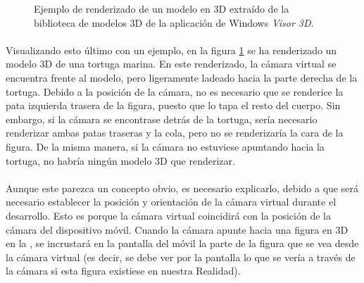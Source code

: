 \documentclass{subfiles}
\begin{document}
        \begin{figure}
        \centering
        \caption{Ejemplo de renderizado de un modelo en 3D extraído de la biblioteca de modelos 3D de la aplicación de Windows \textit{Visor 3D}.}
        \label{fig:tortuga_marina}
        \end{figure}

        \paragraph{}
        Visualizando esto último con un ejemplo, en la figura \ref{fig:tortuga_marina} se ha renderizado un modelo 3D de una tortuga marina. En este renderizado, la cámara virtual se encuentra frente al modelo, pero ligeramente ladeado hacia la parte derecha de la tortuga. Debido a la posición de la cámara, no es necesario que se renderice la pata izquierda trasera de la figura, puesto que lo tapa el resto del cuerpo. Sin embargo, si la cámara se encontrase detrás de la tortuga, sería necesario renderizar ambas patas traseras y la cola, pero no se renderizaría la cara de la figura. De la misma manera, si la cámara no estuviese apuntando hacia la tortuga, no habría ningún modelo 3D que renderizar.
        
        \paragraph{}
        Aunque este parezca un concepto obvio, es necesario explicarlo, debido a que será necesario establecer la posición y orientación de la cámara virtual durante el desarrollo. Esto es porque la cámara virtual coincidirá con la posición de la cámara del dispositivo móvil. Cuando la cámara apunte hacia una figura en 3D en la \ra, se incrustará en la pantalla del móvil la parte de la figura que se vea desde la cámara virtual (es decir, se debe ver por la pantalla lo que se vería a través de la cámara si esta figura existiese en nuestra Realidad).
\end{document}
